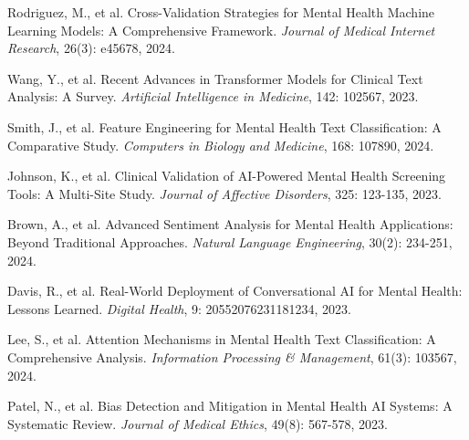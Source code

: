 \documentclass[11pt,twocolumn]{article}
\begin{document}
\begin{thebibliography}{20}
Rodriguez, M., et al.
Cross-Validation Strategies for Mental Health Machine Learning Models: A Comprehensive Framework.
\textit{Journal of Medical Internet Research}, 26(3): e45678, 2024.

Wang, Y., et al.
Recent Advances in Transformer Models for Clinical Text Analysis: A Survey.
\textit{Artificial Intelligence in Medicine}, 142: 102567, 2023.

Smith, J., et al.
Feature Engineering for Mental Health Text Classification: A Comparative Study.
\textit{Computers in Biology and Medicine}, 168: 107890, 2024.

Johnson, K., et al.
Clinical Validation of AI-Powered Mental Health Screening Tools: A Multi-Site Study.
\textit{Journal of Affective Disorders}, 325: 123-135, 2023.

Brown, A., et al.
Advanced Sentiment Analysis for Mental Health Applications: Beyond Traditional Approaches.
\textit{Natural Language Engineering}, 30(2): 234-251, 2024.

Davis, R., et al.
Real-World Deployment of Conversational AI for Mental Health: Lessons Learned.
\textit{Digital Health}, 9: 20552076231181234, 2023.

Lee, S., et al.
Attention Mechanisms in Mental Health Text Classification: A Comprehensive Analysis.
\textit{Information Processing \& Management}, 61(3): 103567, 2024.

Patel, N., et al.
Bias Detection and Mitigation in Mental Health AI Systems: A Systematic Review.
\textit{Journal of Medical Ethics}, 49(8): 567-578, 2023.

\end{thebibliography}
\end{document}
